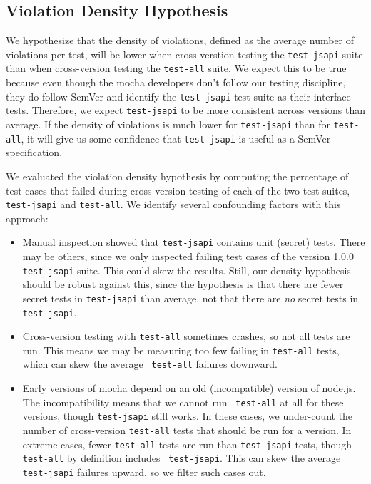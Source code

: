 \subsection{Violation Density Hypothesis}
We hypothesize that the density of violations, defined as the average
number of violations per test, will be lower when cross-verstion
testing the {\tt test-jsapi} suite than when cross-version testing the
{\tt test-all} suite. We expect this to be true because even though
the mocha developers don't follow our testing discipline, they do
follow SemVer and identify the {\tt test-jsapi} test suite as their
interface tests. Therefore, we expect {\tt test-jsapi} to be more
consistent across versions than average. If the density of violations
is much lower for {\tt test-jsapi} than for {\tt test-all}, it will
give us some confidence that {\tt test-jsapi} is useful as a SemVer
specification.

We evaluated the violation density hypothesis by computing the
percentage of test cases that failed during cross-version testing of
each of the two test suites, {\tt test-jsapi} and {\tt test-all}.  We
identify several confounding factors with this approach:
\begin{itemize}
\item Manual inspection showed that {\tt test-jsapi} contains unit
  (secret) tests. There may be others, since we only inspected failing
  test cases of the version 1.0.0 {\tt test-jsapi} suite. This could
  skew the results. Still, our density hypothesis should be robust
  against this, since the hypothesis is that there are fewer secret
  tests in {\tt test-jsapi} than average, not that there are {\em no}
  secret tests in {\tt test-jsapi}.
\item Cross-version testing with {\tt test-all} sometimes crashes, so
  not all tests are run. This means we may be measuring too few
  failing in {\tt test-all} tests, which can skew the average {\tt
    test-all} failures downward.
\item Early versions of mocha depend on an old (incompatible) version
  of node.js. The incompatibility means that we cannot run {\tt
    test-all} at all for these versions, though {\tt test-jsapi} still
  works. In these cases, we under-count the number of cross-version
  {\tt test-all} tests that should be run for a version. In extreme
  cases, fewer {\tt test-all} tests are run than {\tt test-jsapi}
  tests, though {\tt test-all} by definition includes {\tt
    test-jsapi}. This can skew the average {\tt test-jsapi} failures
  upward, so we filter such cases out.
\end{itemize}

